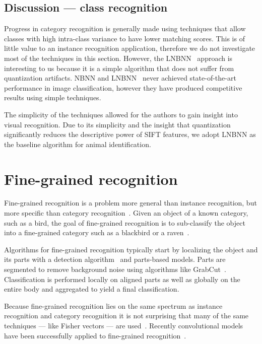     \subsection{Discussion --- class recognition}

        Progress in category recognition is generally made using techniques that allow classes with high
        intra-class variance to have lower matching scores. This is of little value to an instance recognition
        application, therefore we do not investigate most of the techniques in this section. However, the
        LNBNN~\cite{mccann_local_2012} approach is interesting to us because it is a simple algorithm that does not
        suffer from quantization artifacts. NBNN and LNBNN~\cite{boiman_defense_2008,mccann_local_2012} never
        achieved state-of-the-art performance in image classification, however they have produced competitive
        results using simple techniques.

        The simplicity of the techniques allowed for the authors to gain insight into visual recognition. Due to
        its simplicity and the insight that quantization significantly reduces the descriptive power of SIFT
        features, we adopt LNBNN as the baseline algorithm for animal identification.


\section{Fine-grained recognition}\label{sec:fgr}  

    Fine-grained recognition is a problem more general than instance recognition, but more specific than category
    recognition~\cite{parkhi_cats_2012, berg_poof_2013, gavves_local_2014}. Given an object of a known category,
    such as a bird, the goal of fine-grained recognition is to sub-classify the object into a fine-grained category
    such as a blackbird or a raven~\cite{berg_how_2013}.

    Algorithms for fine-grained recognition typically start by localizing the object and its parts with a detection
    algorithm~\cite{dalal_histograms_2005} and parts-based models. Parts are segmented to remove background noise
    using algorithms like GrabCut~\cite{rother_grabcut_2004}. Classification is performed locally on aligned parts
    as well as globally on the entire body and aggregated to yield a final classification.

    Because fine-grained recognition lies on the same spectrum as instance recognition and category recognition it
    is not surprising that many of the same techniques --- like Fisher vectors --- are
    used~\cite{gosselin_revisiting_2014}. Recently convolutional models have been successfully applied to
    fine-grained recognition~\cite{catherine_wah_similarity_2014, branson_bird_2014, zhang_weakly_2015,
    xiao_application_2015}.

